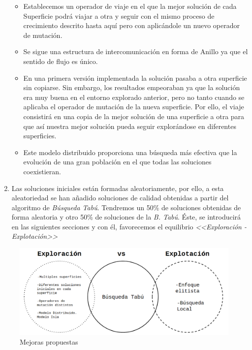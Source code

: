 \begin{enumerate}
	
	\begin{itemize}
		\item 	Establecemos un operador de viaje en el que la mejor solución de cada Superficie podrá viajar a otra y seguir con el mismo proceso de crecimiento descrito hasta aquí pero con aplicándole un nuevo operador de mutación.
		
		\item 	Se sigue una estructura de intercomunicación en forma de Anillo ya que el sentido de flujo es único.
		
		\newpage 
		
		\item  En una primera versión implementada la solución pasaba a otra superficie sin copiarse. Sin embargo, los resultados empeoraban ya que la solución era muy buena en el entorno explorado anterior, pero no tanto cuando se aplicaba el operador de mutación de la nueva superficie.
	 Por ello, el viaje consistirá en una copia de la mejor solución de una superficie a otra para que así nuestra mejor solución pueda seguir explorándose en diferentes superficies.
		
		\item 	Este modelo distribuido proporciona una búsqueda más efectiva que la evolución de una gran población en el que todas las soluciones coexistieran.
	\end{itemize}
 
	

	


	
	\item Las soluciones iniciales están formadas aleatoriamente, por ello, a esta aleatoriedad se han añadido soluciones de calidad obtenidas a partir del algoritmo de \textit{Búsqueda Tabú}. Tendremos un 50\% de soluciones obtenidas de forma aleatoria y otro 50\% de soluciones de la \textit{B. Tabú}. Éste, se introducirá en las siguientes secciones y con él, favorecemos el equilibrio \textit{<<Exploración - Explotación>>}
\end{enumerate}


	\begin{figure}[H]
	\centering
	\includegraphics[scale=0.35]{img/lol.png}
	\caption{Mejoras propuestas}
\end{figure}


